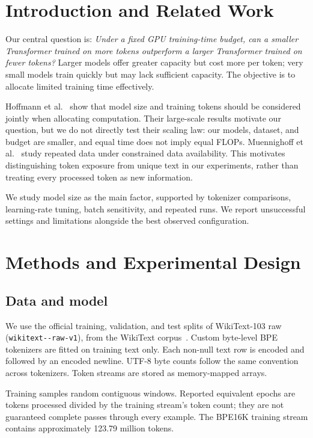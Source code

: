 \documentclass[11pt]{article}
\begin{document}
\section{Introduction and Related Work}
Our central question is: \emph{Under a fixed GPU training-time budget, can a smaller Transformer trained on more tokens outperform a larger Transformer trained on fewer tokens?} Larger models offer greater capacity but cost more per token; very small models train quickly but may lack sufficient capacity. The objective is to allocate limited training time effectively.

Hoffmann et al.~\cite{hoffmann} show that model size and training tokens should be considered jointly when allocating computation. Their large-scale results motivate our question, but we do not directly test their scaling law: our models, dataset, and budget are smaller, and equal time does not imply equal FLOPs. Muennighoff et al.~\cite{muennighoff} study repeated data under constrained data availability. This motivates distinguishing token exposure from unique text in our experiments, rather than treating every processed token as new information.

We study model size as the main factor, supported by tokenizer comparisons, learning-rate tuning, batch sensitivity, and repeated runs. We report unsuccessful settings and limitations alongside the best observed configuration.

\section{Methods and Experimental Design}
\subsection{Data and model}
We use the official training, validation, and test splits of WikiText-103 raw (\texttt{wikitext--\allowbreak raw-\allowbreak v1}), from the WikiText corpus~\cite{merity}. Custom byte-level BPE tokenizers are fitted on training text only. Each non-null text row is encoded and followed by an encoded newline. UTF-8 byte counts follow the same convention across tokenizers. Token streams are stored as memory-mapped arrays.

Training samples random contiguous windows. Reported equivalent epochs are tokens processed divided by the training stream's token count; they are not guaranteed complete passes through every example. The BPE16K training stream contains approximately 123.79 million tokens.
\end{document}
